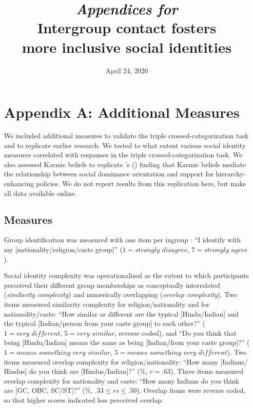\documentclass[12pt, a4paper]{article}
\title{\emph{Appendices for}\\Intergroup contact fosters\\more inclusive social identities}
\date{April 24, 2020}
\begin{document}
\maketitle

\section{Appendix A: Additional Measures}

We included additional measures to validate the triple crossed-categorization task and to replicate earlier research. We tested to what extent various social identity measures correlated with responses in the triple crossed-categorization task. We also assessed Karmic beliefs to replicate \citeauthor{cotterill_ideological_2014}'s (\citeyear{cotterill_ideological_2014}) finding that Karmic beliefs mediate the relationship between social dominance orientation and support for hierarchy-enhancing policies. We do not report results from this replication here, but make all data available online.

\subsection{Measures}

Group identification was measured with one item per ingroup \parencite{postmes_single-item_2013}: ``I identify with my [nationality/religion/caste group]'' ($1 = \textit{strongly disagree}$, $7 = \textit{strongly agree}$).

Social identity complexity \parencite{roccas_social_2002, schmid_antecedents_2009} was operationalized as the extent to which participants perceived their different group memberships as conceptually interrelated (\emph{similarity complexity}) and numerically overlapping (\emph{overlap complexity}). Two items measured similarity complexity for religion/nationality and for nationality/caste: ``How similar or different are the typical [Hindu/Indian] and the typical [Indian/person from your caste group] to each other?'' ($1 = \textit{very different}$, $5 = \textit{very similar}$, reverse coded), and ``Do you think that being [Hindu/Indian] means the same as being [Indian/from your caste group]?'' ($1 = \textit{means something very similar}$, $5 = \textit{means something very different}$).  Two items measured overlap complexity for religion/nationality: ``How many [Indians/ Hindus] do you think are [Hindus/Indian]?” (\%, $r = .63$). Three items measured overlap complexity for nationality and caste: ``How many Indians do you think are [GC, OBC, SC/ST]?'' (\%, $.33 \leq rs \leq .50$). Overlap items were reverse coded, so that higher scores indicated less perceived overlap.
\end{document}
